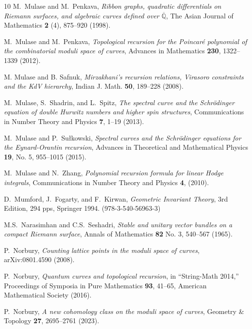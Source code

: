 \documentclass{amsart}
\theoremstyle{definition}
\numberwithin{equation}{section}
\numberwithin{figure}{section}
\begin{document}
\begin{thebibliography}{10}
 M.~Mulase and M.~Penkava, 
 \emph{Ribbon graphs, quadratic differentials on Riemann surfaces, and algebraic curves defined over $\overline{\mathbb{Q}}$}, The Asian Journal of Mathematics  \textbf{2} (4), 875--920 (1998).


 M.~Mulase and M.~Penkava, 
 \emph{Topological recursion for the Poincar\'e 
 polynomial of the combinatorial moduli space of curves}, 
 Advances in Mathematics \textbf{230}, 1322--1339 (2012).
 


 M. Mulase and B. Safnuk, 
\emph{Mirzakhani's recursion relations, Virasoro constraints and the KdV hierarchy},
Indian J. Math. \textbf{50}, 189--228 (2008).



M.~Mulase, S.~Shadrin, and L.~Spitz,
\emph{The spectral curve and the 
Schr\"odinger equation of  double
Hurwitz numbers and higher spin structures},
Communications in Number Theory and Physics 
\textbf{7}, 1--19 (2013).

 M.~Mulase and P.~Su\l kowski,
 \emph{Spectral curves and the Schr\"odinger equations
for the Eynard-Orantin recursion},
Advances in Theoretical and Mathematical Physics 
\textbf{19}, No. 5, 955--1015 (2015).



 M.~Mulase and N.~Zhang,
\emph{Polynomial recursion formula for linear Hodge integrals},  Communications in Number Theory
and Physics {\bf 4}, (2010).

 D.~Mumford, J.~Fogarty, and F.~Kirwan,
 \emph{Geometric Invariant Theory}, 3rd Edition, 294 pps, Springer
 1994.
 (978-3-540-56963-3)


M.S.~Narasimhan and C.S.~Seshadri, 
\emph{Stable and unitary vector bundles on a compact Riemann surface},
Annals of Mathematics \textbf{82} No. 3, 540--567 (1965).


   P.~Norbury,
  \emph{Counting lattice points in the moduli space of curves},
  arXiv:0801.4590  (2008).



  
P.~Norbury,
\emph{Quantum curves and topological recursion},
in ``String-Math 2014,''
Proceedings of Symposia in Pure Mathematics \textbf{93}, 
 41--65, American Mathematical Society (2016).   

  
 P.~Norbury,
\emph{A new cohomology class on the moduli space of curves},
Geometry \& Topology \textbf{27}, 2695--2761 (2023).




\end{thebibliography}
\end{document}
